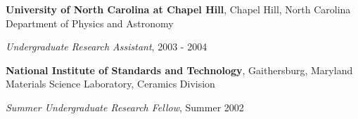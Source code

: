 {\bf University of North Carolina at Chapel Hill}, Chapel Hill, North Carolina\\
Department of Physics and Astronomy
\begin{list1}
\item[] {\em Undergraduate Research Assistant}, 2003 - 2004
\end{list1}

{\bf National Institute of Standards and Technology}, Gaithersburg, Maryland\\
Materials Science Laboratory, Ceramics Division
\begin{list1}
\item[] {\em Summer Undergraduate Research Fellow}, Summer 2002
\end{list1}

